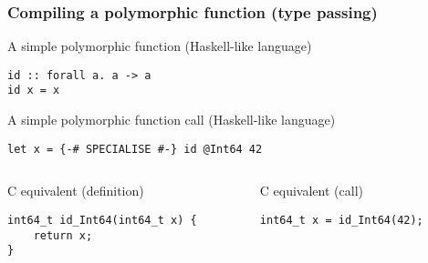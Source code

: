 \documentclass[t]{beamer}
\begin{document}
\begin{frame}[fragile]
\frametitle{Compiling a polymorphic function (type passing)}

\begin{block}{A simple polymorphic function (Haskell-like language)}
\begin{verbatim}
id :: forall a. a -> a
id x = x
\end{verbatim}
\end{block}

\begin{block}{A simple polymorphic function call (Haskell-like language)}
\begin{verbatim}
let x = {-# SPECIALISE #-} id @Int64 42
\end{verbatim}
\end{block}

\begin{columns}
\begin{column}{0.48\textwidth}
\begin{block}{C equivalent (definition)}
\begin{verbatim}
int64_t id_Int64(int64_t x) {
    return x;
}
\end{verbatim}
\end{block}
\end{column}

\begin{column}{0.48\textwidth}
\begin{block}{C equivalent (call)}
\begin{verbatim}
int64_t x = id_Int64(42);
\end{verbatim}
\end{block}
\end{column}
\end{columns}

\end{frame}
\end{document}
